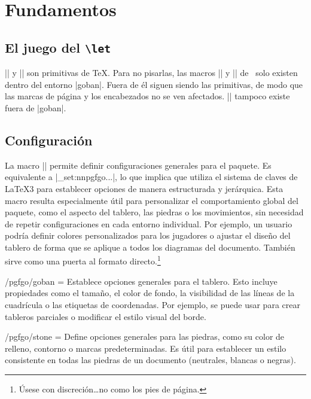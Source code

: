 \section{Fundamentos}

\subsection{El juego del \texttt{\textbackslash let}}

|\mark| y |\marks| son primitivas de \TeX. Para no pisarlas, las macros |\mark| y |\marks| de \pgfgoname\ solo existen dentro del entorno |goban|. Fuera de él siguen siendo las primitivas, de modo que las marcas de página y los encabezados no se ven afectados. |\sgf| tampoco existe fuera de |goban|.

\subsection{Configuración}

La macro || permite definir configuraciones generales para el paquete. Es equivalente a |\keys_set:nn{pgfgo}{...}|, lo que implica que utiliza el sistema de claves de LaTeX3 para establecer opciones de manera estructurada y jerárquica. Esta macro resulta especialmente útil para personalizar el comportamiento global del paquete, como el aspecto del tablero, las piedras o los movimientos, sin necesidad de repetir configuraciones en cada entorno individual. Por ejemplo, un usuario podría definir colores personalizados para los jugadores o ajustar el diseño del tablero de forma que se aplique a todos los diagramas del documento. También sirve como una puerta al formato directo.\footnote{Úsese con discreción\dots no como los pies de página.}

\begin{command}{\pgfgoset{}}
\end{command}

\begin{key}{/pgfgo/goban = }
	Establece opciones generales para el tablero. Esto incluye propiedades como el tamaño, el color de fondo, la visibilidad de las líneas de la cuadrícula o las etiquetas de coordenadas. Por ejemplo, se puede usar para crear tableros parciales o modificar el estilo visual del borde.
\end{key}

\begin{key}{/pgfgo/stone = }
	Define opciones generales para las piedras, como su color de relleno, contorno o marcas predeterminadas. Es útil para establecer un estilo consistente en todas las piedras de un documento (neutrales, blancas o negras).
\end{key}


